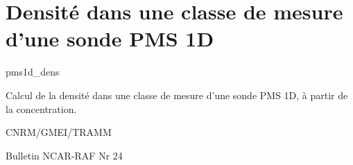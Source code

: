 %
\section{Densit\'e dans une classe de mesure d'une sonde
PMS 1D}

 {\sf pms1d\_dens}

Calcul de la densit\'e dans une classe de mesure d'une
sonde PMS 1D, \`a partir de la concentration.

\bigskip





CNRM/GMEI/TRAMM

Bulletin NCAR-RAF Nr 24 \cite{RAF-24}
